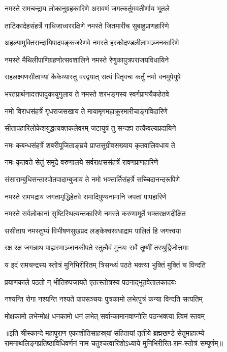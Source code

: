 

\twolineshloka
{नमस्ते रामचन्द्राय लोकानुग्रहकारिणे}
{अरावणं जगत्कर्तुमवतीर्णाय भूतले}%

\twolineshloka
{ताटिकादेहसंहर्त्रे गाधिजाध्वररक्षिणे}
{नमस्ते जितमारीच सुबाहुप्राणहारिणे}%

\twolineshloka
{अहल्यामुक्तिसन्दायिपादपङ्कजरेणवे}
{नमस्ते हरकोदण्डलीलाभञ्जनकारिणे}%

\twolineshloka
{नमस्ते मैथिलीपाणिग्रहणोत्सवशालिने}
{नमस्ते रेणुकापुत्रपराजयविधायिने}%

\twolineshloka
{सहलक्ष्मणसीताभ्यां कैकेय्यास्तु वरद्वयात्}
{सत्यं पितृवचः कर्तुं नमो वनमुपेयुषे}%

\twolineshloka
{भरतप्रार्थनादत्तपादुकायुगुलाय ते}
{नमस्ते शरभङ्गस्य स्वर्गप्राप्त्यैकहेतवे}%

\twolineshloka
{नमो विराधसंहर्त्रे गृधराजसखाय ते}
{मायामृगमहाक्रूरमारीचाङ्गविदारिणे}%

\twolineshloka
{सीतापहारिलोकेशयुद्धत्यक्तकलेवरम्}
{जटायुषं तु सन्दह्य तत्कैवल्यप्रदायिने}%

\twolineshloka
{नमः कबन्धसंहर्त्रे शबरीपूजिताङ्घ्रये}
{प्राप्तसुग्रीवसख्याय कृतवालिवधाय ते}%

\twolineshloka
{नमः कृतवते सेतुं समुद्रे वरुणालये}
{सर्वराक्षससंहर्त्रे रावणप्राणहारिणे}%

\twolineshloka
{संसाराम्बुधिसन्तारपोतपादाम्बुजाय ते}
{नमो भक्तार्तिसंहर्त्रे सच्चिदानन्दरूपिणे}%

\twolineshloka
{नमस्ते रामभद्राय जगतामृद्धिहेतवे}
{रामादिपुण्यनामानि जपतां पापहारिणे}%

\twolineshloka
{नमस्ते सर्वलोकानां सृष्टिस्थित्यन्तकारिणे}
{नमस्ते करुणामूर्ते भक्तरक्षणदीक्षित}%

\twolineshloka
{ससीताय नमस्तुभ्यं विभीषणसुखप्रद}
{लङ्केश्वरवधाद्राम पालितं हि जगत्त्वया}%

\twolineshloka
{रक्ष रक्ष जगन्नाथ पाह्यस्माञ्जानकीपते}
{स्तुत्वैवं मुनयः सर्वे तूष्णीं तस्थुर्द्विजोत्तमाः}%


\twolineshloka
{य इदं रामचन्द्रस्य स्तोत्रं मुनिभिरीरितम्}
{त्रिसन्ध्यं पठते भक्त्या भुक्तिं मुक्तिं च विन्दति}%

\twolineshloka
{प्रयाणकाले पठतो न् भीतिरुपजायते}
{एतत्स्तोत्रस्य पठनाद्भूतवेतालकादयः}%

\twolineshloka
{नश्यन्ति रोगा नश्यन्ति नश्यते पापसञ्चयः}
{पुत्रकामो लभेत्पुत्रं कन्या विन्दति सत्पतिम्}%

\twolineshloka
{मोक्षकामो लभेन्मोक्षं धनकामो धनं लभेत्}
{सर्वान्कामानवाप्नोति पठन्भक्त्या त्विमं स्तवम्}%

॥इति श्रीस्कान्दे महापुराण एकाशीतिसाहस्र्यां संहितायां तृतीये ब्रह्मखण्डे सेतुमाहात्म्ये रामनाथलिङ्गप्रतिष्ठाविधिवर्णनं नाम चतुश्चत्वारिंशोऽध्याये मुनिभिरीरित-राम-स्तोत्रं सम्पूर्णम्॥

